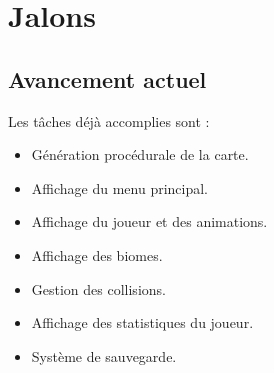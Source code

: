 \documentclass{article}
\begin{document}
\section{Jalons}

\subsection{Avancement actuel}
Les tâches déjà accomplies sont :
\begin{itemize}
    \item Génération procédurale de la carte.
    \item Affichage du menu principal.
    \item Affichage du joueur et des animations.
    \item Affichage des biomes.
    \item Gestion des collisions.
    \item Affichage des statistiques du joueur.
    \item Système de sauvegarde.
\end{itemize}
\end{document}
